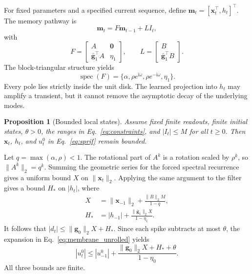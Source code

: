 \documentclass[letterpaper,journal]{IEEEtran}
\DeclareMathOperator{\spec}{spec}
\newtheorem{proposition}{Proposition}
\begin{document}
For fixed parameters and a specified current sequence, define
$\mathbf m_t=[\mathbf x_t^\top,h_t]^\top$. The memory pathway is
\begin{equation}
\mathbf m_t=F\mathbf m_{t-1}+LI_t,
\label{eq:memory_system}
\end{equation}
with
\begin{equation}
F=
\begin{bmatrix}
A&\mathbf0\\
\bar{\mathbf g}_1^\top A&\eta_1
\end{bmatrix},
\qquad
L=
\begin{bmatrix}B\\\bar{\mathbf g}_1^\top B\end{bmatrix}.
\label{eq:memory_matrices}
\end{equation}
The block-triangular structure yields
\begin{equation}
\spec(F)=\{\alpha,\rho e^{\mathrm i\omega},
               \rho e^{-\mathrm i\omega},\eta_1\}.
\label{eq:F_poles}
\end{equation}
Every pole lies strictly inside the unit disk. The learned projection into $h_t$ may amplify a transient, but it cannot remove the asymptotic decay of the underlying modes.

\begin{proposition}[Bounded local states]
Assume fixed finite readouts, finite initial states, $\theta>0$, the ranges in Eq.~\eqref{eq:constraints}, and $|I_t|\leq M$ for all $t\geq0$. Then $\mathbf x_t$, $h_t$, and $u_t^0$ in Eq.~\eqref{eq:sprif} remain bounded.
\label{prop:boundedness}
\end{proposition}
\begin{IEEEproof}
Let $q=\max(\alpha,\rho)<1$. The rotational part of $A^k$ is a rotation scaled by $\rho^k$, so $\|A^k\|_2=q^k$. Summing the geometric series for the forced spectral recurrence gives a uniform bound $X$ on $\|\mathbf x_t\|_2$. Applying the same argument to the filter gives a bound $H_*$ on $|h_t|$, where
\begin{equation}
\begin{aligned}
X &= \|\mathbf x_{-1}\|_2 + \frac{\|B\|_2 M}{1-q},\\
H_* &= |h_{-1}| + \frac{\|\bar{\mathbf g}_1\|_2 X}{1-\eta_1}.
\end{aligned}
\label{eq:local_bounds}
\end{equation}
It follows that $|d_t|\leq \|\mathbf g_0\|_2X+H_*$. Since each spike subtracts at most $\theta$, the expansion in Eq.~\eqref{eq:membrane_unrolled} yields
\begin{equation}
|u_t^0|\leq |u_{-1}^0|+
\frac{\|\mathbf g_0\|_2 X+H_*+\theta}{1-\eta_0}.
\label{eq:u_bound}
\end{equation}
All three bounds are finite.
\end{IEEEproof}
\end{document}
